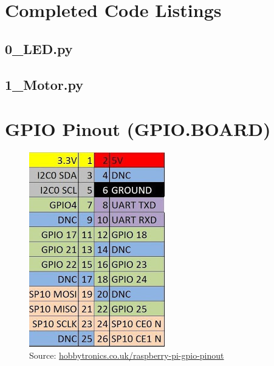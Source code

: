 \documentclass[a4paper, twocolumn, twoside, 11pt]{article}
\begin{document}
	\begin{appendices}
		
		
	\section{Completed Code Listings}
	
		\subsection*{0\_LED.py}
			
		\newpage
		\subsection*{1\_Motor.py}
				
			
	\section{GPIO Pinout (GPIO.BOARD)}
	
	\begin{figure}[h]
		\label{sec:pinout}
		\centering
		\includegraphics[width=0.5\linewidth]{img/pinout_pi}
		\scriptsize
		\\Source: \url{hobbytronics.co.uk/raspberry-pi-gpio-pinout}
		\normalsize
		\label{fig:pinout}
	\end{figure}
	\end{appendices}
\end{document}
